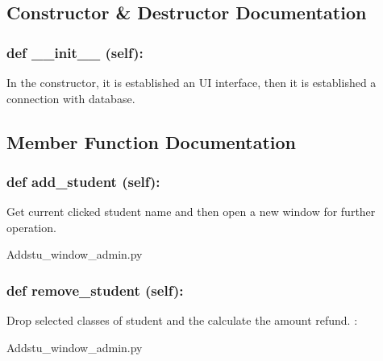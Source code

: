 \subsection{Constructor \& Destructor Documentation}
\hypertarget{class_poly_aa3def076b74bed67904976ad4f9fe9b1}{
\subsubsection[{def __init__ (self):}]{\setlength{\rightskip}{0pt plus 5cm}def {\_\_init\_\_} (self): 
}}

In the constructor, it is established an UI interface, then it is  established a connection with database.

\subsection{Member Function Documentation}

\hypertarget{class_poly_a14a7ad77ce612b0c54f531d307ee4b39}{
\subsubsection[{def add_student(self):}]{\setlength{\rightskip}{0pt plus 5cm}def {add\_student} (self):}}\label{class_poly_a14a7ad77ce612b0c54f531d307ee4b39}
Get current clicked student name and then open a new window for further operation.
\begin{DoxyCompactItemize}
\item 
Addstu\_window\_admin.\-py\end{DoxyCompactItemize}

\hypertarget{class_poly_a14a7ad77ce612b0c54f531d307ee4b39}{
\subsubsection[{def remove_student(self):}]{\setlength{\rightskip}{0pt plus 5cm}def {remove\_student} (self):}}\label{class_poly_a14a7ad77ce612b0c54f531d307ee4b39}
Drop selected classes of student and the calculate the amount refund.
:\begin{DoxyCompactItemize}
\item 
Addstu\_window\_admin.\-py\end{DoxyCompactItemize}

